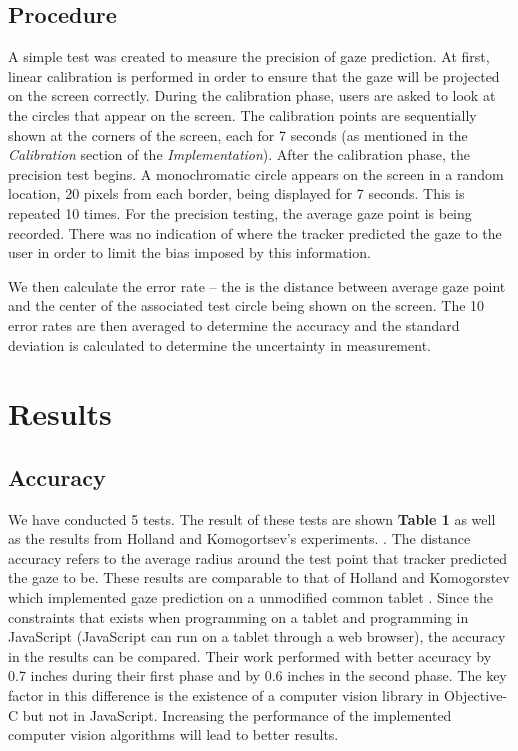\documentclass[annual]{acmsiggraph}
\begin{document}
\subsection{Procedure}

A simple test was created to measure the precision of gaze prediction. At
first, linear calibration is performed in order to ensure that the gaze will be
projected on the screen correctly. During the calibration phase, users are
asked to look at the circles that appear on the screen. The calibration points
are sequentially shown at the corners of the screen, each for 7 seconds (as
mentioned in the \emph{Calibration} section of the \emph{Implementation}).
After the calibration phase, the precision test begins. A monochromatic circle
appears on the screen in a random location, 20 pixels from each border, being
displayed for 7 seconds.  This is repeated 10 times. For the precision testing,
the average gaze point is being recorded.  There was no indication of where the
tracker predicted the gaze to the user in order to limit the bias imposed by
this information.

We then calculate the error rate -- the is the distance between average gaze
point and the center of the associated test circle being shown on the screen.
The 10 error rates are then averaged to determine the accuracy and the standard
deviation is calculated to determine the uncertainty in measurement.

\section{Results}

\subsection{Accuracy}

We have conducted 5 tests. The result of these tests are shown \textbf{Table 1}
as well as the results from Holland and Komogortsev's experiments.
.  The distance accuracy refers to the average radius
around the test point that tracker predicted the gaze to be. These results are
comparable to that of Holland and Komogorstev which implemented gaze prediction
on a unmodified common tablet . Since the constraints
that exists when programming on a tablet and programming in JavaScript
(JavaScript can run on a tablet through a web browser), the accuracy in the
results can be compared.  Their work performed with better accuracy by 0.7
inches during their first phase and by 0.6 inches in the second phase. The key
factor in this difference is the existence of a computer vision library in
Objective-C but not in JavaScript.  Increasing the performance of the
implemented computer vision algorithms will lead to better results.
\end{document}
